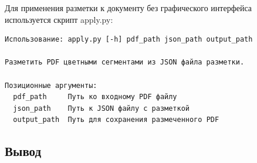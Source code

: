 Для применения разметки к документу без графического интерфейса используется скрипт apply.py:
\begin{lstlisting}[caption={Запуск скрипта для применения разметки к PDF документу}]
Использование: apply.py [-h] pdf_path json_path output_path

Разметить PDF цветными сегментами из JSON файла разметки.

Позиционные аргументы:
  pdf_path     Путь ко входному PDF файлу
  json_path    Путь к JSON файлу с разметкой
  output_path  Путь для сохранения размеченного PDF
\end{lstlisting}

\subsection*{Вывод}

